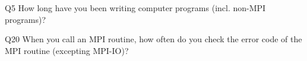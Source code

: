 \begin{description}%
\item{Q5} How long have you been writing computer programs (incl. non-MPI programs)?%
\item{Q20} When you call an MPI routine, how often do you check the error code of the MPI routine  (excepting MPI-IO)?%
\end{description}%
